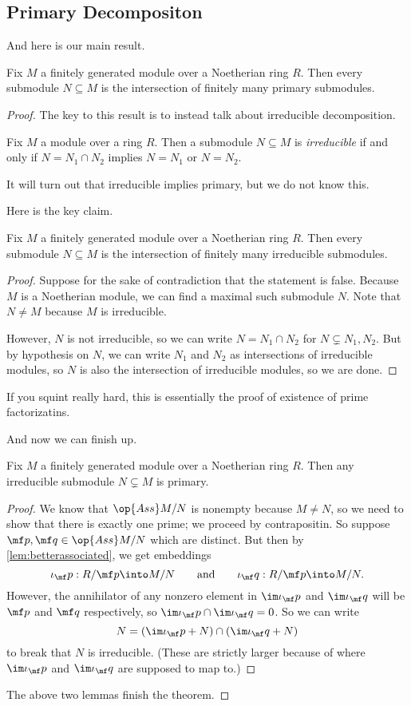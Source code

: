 \subsection{Primary Decompositon}
And here is our main result.
\begin{theorem}
	Fix $M$ a finitely generated module over a Noetherian ring $R$. Then every submodule $N\subseteq M$ is the intersection of finitely many primary submodules.
\end{theorem}
\begin{proof}
	The key to this result is to instead talk about irreducible decomposition.
	\begin{definition}[Irreducible]
		Fix $M$ a module over a ring $R$. Then a submodule $N\subseteq M$ is \textit{irreducible} if and only if $N=N_1\cap N_2$ implies $N=N_1$ or $N=N_2$.
	\end{definition}
	It will turn out that irreducible implies primary, but we do not know this.

	Here is the key claim.
	\begin{lemma}
		Fix $M$ a finitely generated module over a Noetherian ring $R$. Then every submodule $N\subseteq M$ is the intersection of finitely many irreducible submodules.
	\end{lemma}
	\begin{proof}
		Suppose for the sake of contradiction that the statement is false. Because $M$ is a Noetherian module, we can find a maximal such submodule $N$. Note that $N\ne M$ because $M$ is irreducible.

		However, $N$ is not irreducible, so we can write $N=N_1\cap N_2$ for $N\subsetneq N_1,N_2$. But by hypothesis on $N$, we can write $N_1$ and $N_2$ as intersections of irreducible modules, so $N$ is also the intersection of irreducible modules, so we are done.
	\end{proof}
	\begin{remark}[Nir]
		If you squint really hard, this is essentially the proof of existence of prime factorizatins.
	\end{remark}
	And now we can finish up.
	\begin{lemma}
		Fix $M$ a finitely generated module over a Noetherian ring $R$. Then any irreducible submodule $N\subsetneq M$ is primary.
	\end{lemma}
	\begin{proof}
		We know that $\op{Ass}M/N$ is nonempty because $M\ne N$, so we need to show that there is exactly one prime; we proceed by contrapositin. So suppose $\mf p,\mf q\in\op{Ass}M/N$ which are distinct. But then by \autoref{lem:betterassociated}, we get embeddings
		\[\iota_\mf p:R/\mf p\into M/N\qquad\text{and}\qquad \iota_\mf q:R/\mf p\into M/N.\]
		However, the annihilator of any nonzero element in $\im\iota_\mf p$ and $\im\iota_\mf q$ will be $\mf p$ and $\mf q$ respectively, so $\im\iota_\mf p\cap\im\iota_\mf q=0$. So we can write
		\[N=(\im\iota_\mf p+N)\cap(\im\iota_\mf q+N)\]
		to break that $N$ is irreducible. (These are strictly larger because of where $\im\iota_\mf p$ and $\im\iota_\mf q$ are supposed to map to.)
	\end{proof}
	The above two lemmas finish the theorem.
\end{proof}
